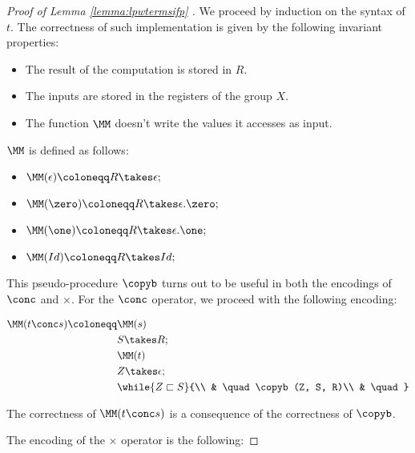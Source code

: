 \begin{proof}[Proof of Lemma \ref{lemma:lpwtermsifp} ]
We proceed by induction on the syntax of $t$. The correctness of such implementation is given by the following invariant properties:
\begin{itemize}
\item The result of the computation is stored in $R$.
\item The inputs are stored in the registers of the group $X$.
\item The function $\MM$ doesn't write the values it accesses as input.
\end{itemize}

$\MM$ is defined as follows:
\begin{itemize}
\item $\MM(\epsilon)\coloneqq R \takes \epsilon ;$
\item $\MM(\zero)\coloneqq R \takes \epsilon.\zero ;$
\item $\MM(\one)\coloneqq R \takes \epsilon.\one ;$
\item $\MM(Id)\coloneqq R \takes Id ;$
\end{itemize}

This pseudo-procedure $\copyb$ turns out to be useful in both the encodings of $\conc$ and $\times$. For the $\conc$ operator, we proceed with the following encoding:

\begin{align*}
\MM(t \conc s)\coloneqq &\MM(s)\\
& S \takes R;\\
& \MM(t)\\
& Z \takes \epsilon; \\
& \while {Z \sqsubset S}{\\
& \quad \copyb(Z, S, R)\\
& \quad }\\
\end{align*}

The correctness of $\MM(t \conc s)$ is a consequence of the correctness of $\copyb$.

The encoding of the $\times$ operator is the following:


\end{proof}
